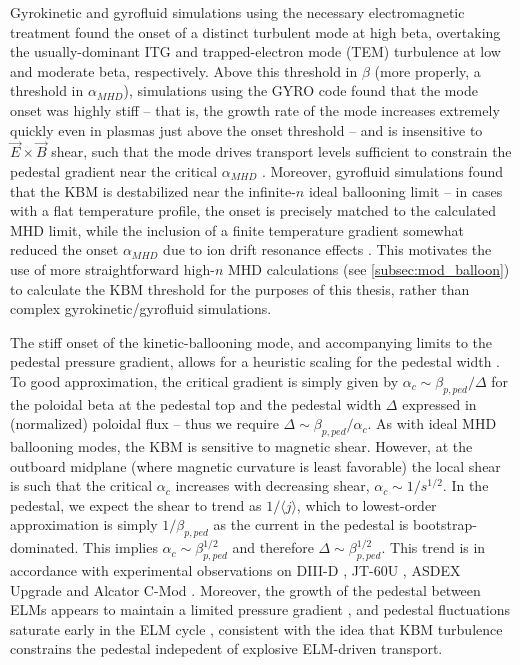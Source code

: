 Gyrokinetic and gyrofluid simulations using the necessary electromagnetic treatment \cite{Jenko2001,Snyder2001,Scott2003,Candy2005} found the onset of a distinct turbulent mode at high beta, overtaking the usually-dominant ITG and trapped-electron mode (TEM) turbulence at low and moderate beta, respectively.  Above this threshold in $\beta$ (more properly, a threshold in $\alpha_{MHD}$), simulations using the GYRO code \cite{Candy2003} found that the mode onset was highly stiff -- that is, the growth rate of the mode increases extremely quickly even in plasmas just above the onset threshold \cite{Candy2005} -- and is insensitive to $\vec{E}\times\vec{B}$ shear, such that the mode drives transport levels sufficient to constrain the pedestal gradient near the critical $\alpha_{MHD}$ \cite{Snyder2009}.  Moreover, gyrofluid simulations found that the KBM is destabilized near the infinite-$n$ ideal ballooning limit -- in cases with a flat temperature profile, the onset is precisely matched to the calculated MHD limit, while the inclusion of a finite temperature gradient somewhat reduced the onset $\alpha_{MHD}$ due to ion drift resonance effects \cite{Snyder2001}.  This motivates the use of more straightforward high-$n$ MHD calculations (see \cref{subsec:mod_balloon}) to calculate the KBM threshold for the purposes of this thesis, rather than complex gyrokinetic/gyrofluid simulations.

The stiff onset of the kinetic-ballooning mode, and accompanying limits to the pedestal pressure gradient, allows for a heuristic scaling for the pedestal width \cite{Snyder2009}.  To good approximation, the critical gradient is simply given by $\alpha_c \sim \beta_{p,ped}/\Delta$ for the poloidal beta at the pedestal top and the pedestal width $\Delta$ expressed in (normalized) poloidal flux -- thus we require $\Delta \sim \beta_{p,ped}/\alpha_c$.  As with ideal MHD ballooning modes, the KBM is sensitive to magnetic shear.  However, at the outboard midplane (where magnetic curvature is least favorable) the local shear is such that the critical $\alpha_c$ increases with decreasing shear, $\alpha_c \sim 1/s^{1/2}$.  In the pedestal, we expect the shear to trend as $1/\langle j \rangle$, which to lowest-order approximation is simply $1/\beta_{p,ped}$ as the current in the pedestal is bootstrap-dominated.  This implies $\alpha_c \sim \beta_{p,ped}^{1/2}$ and therefore $\Delta \sim \beta_{p,ped}^{1/2}$.  This trend is in accordance with experimental observations on DIII-D \cite{Osborne1998}, JT-60U \cite{Oyama2005,Urano2008}, ASDEX Upgrade \cite{Gruber1999,Beurskens2011} and Alcator C-Mod \cite{LaBombard2008}.  Moreover, the growth of the pedestal between ELMs appears to maintain a limited pressure gradient \cite{Maggi2010,Groebner2013}, and pedestal fluctuations saturate early in the ELM cycle \cite{Diallo2014}, consistent with the idea that KBM turbulence constrains the pedestal indepedent of explosive ELM-driven transport.

